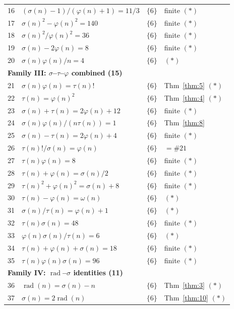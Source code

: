 \documentclass{article}
\newcommand{\rad}{\operatorname{rad}}
\begin{document}
\begin{longtable}{rp{7.5cm}ll}
16 & $(\sigma(n)-1) / (\varphi(n)+1) = 11/3$ & $\{6\}$ & finite $(*)$ \\
17 & $\sigma(n)^2 - \varphi(n)^2 = 140$ & $\{6\}$ & finite $(*)$ \\
18 & $\sigma(n)^2 / \varphi(n)^2 = 36$ & $\{6\}$ & finite $(*)$ \\
19 & $\sigma(n) - 2\varphi(n) = 8$ & $\{6\}$ & finite $(*)$ \\
20 & $\sigma(n)\varphi(n)/n = 4$ & $\{6\}$ & $(*)$ \\[4pt]
\multicolumn{4}{l}{\textbf{Family III: $\sigma$--$\tau$--$\varphi$ combined (15)}} \\
21 & $\sigma(n)\varphi(n) = \tau(n)!$ & $\{6\}$ & Thm~\ref{thm:5} $(*)$ \\
22 & $\tau(n) = \varphi(n)^2$ & $\{6\}$ & Thm~\ref{thm:4} $(*)$ \\
23 & $\sigma(n) + \tau(n) = 2\varphi(n) + 12$ & $\{6\}$ & finite $(*)$ \\
24 & $\sigma(n)\varphi(n) / (n\tau(n)) = 1$ & $\{6\}$ & Thm~\ref{thm:8} \\
25 & $\sigma(n) - \tau(n) = 2\varphi(n) + 4$ & $\{6\}$ & finite $(*)$ \\
26 & $\tau(n)! / \sigma(n) = \varphi(n)$ & $\{6\}$ & $= \#21$ \\
27 & $\tau(n)\varphi(n) = 8$ & $\{6\}$ & finite $(*)$ \\
28 & $\tau(n) + \varphi(n) = \sigma(n)/2$ & $\{6\}$ & finite $(*)$ \\
29 & $\tau(n)^2 + \varphi(n)^2 = \sigma(n) + 8$ & $\{6\}$ & finite $(*)$ \\
30 & $\tau(n) - \varphi(n) = \omega(n)$ & $\{6\}$ & $(*)$ \\
31 & $\sigma(n)/\tau(n) = \varphi(n) + 1$ & $\{6\}$ & $(*)$ \\
32 & $\tau(n)\sigma(n) = 48$ & $\{6\}$ & finite $(*)$ \\
33 & $\varphi(n)\sigma(n)/\tau(n) = 6$ & $\{6\}$ & $(*)$ \\
34 & $\tau(n) + \varphi(n) + \sigma(n) = 18$ & $\{6\}$ & finite $(*)$ \\
35 & $\tau(n)\varphi(n)\sigma(n) = 96$ & $\{6\}$ & finite $(*)$ \\[4pt]
\multicolumn{4}{l}{\textbf{Family IV: $\rad$--$\sigma$ identities (11)}} \\
36 & $\rad(n) = \sigma(n) - n$ & $\{6\}$ & Thm~\ref{thm:3} $(*)$ \\
37 & $\sigma(n) = 2\rad(n)$ & $\{6\}$ & Thm~\ref{thm:10} $(*)$ \\

\end{longtable}
\end{document}
